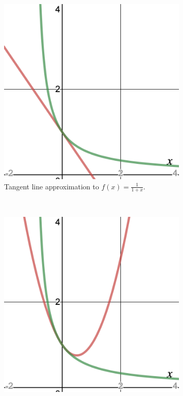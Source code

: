 \begin{figure}[H]
    \centering
    \begin{subfigure}[h]{.3\textwidth}
        \includegraphics[width=\textwidth]{Figures_Part_3/tangent_line_approx.png}
        \caption{Tangent line approximation to $f(x)=\frac{1}{1+x}$.}
    \end{subfigure}
    ~
    \begin{subfigure}[h]{.3\textwidth}
        \includegraphics[width=\textwidth]{Figures_Part_3/tangent_quad_approx.png}

\end{subfigure}
\end{figure}
